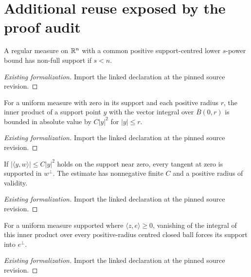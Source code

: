 \section{Additional reuse exposed by the proof audit}

\begin{lemma}
\label{gmt:support-not-full}
\leanok
A regular measure on $\mathbb R^n$ with a common positive support-centred lower $s$-power bound has non-full support if $s<n$.
\end{lemma}
\begin{proof}[Existing formalization]
\leanok
{}
Import the linked declaration at the pinned source revision.
\end{proof}

\begin{lemma}
\label{gmt:barycenter-quadratic-bound}
\leanok
For a uniform measure with zero in its support and each positive radius $r$, the inner product of a support point $y$ with the vector integral over $\overline B(0,r)$ is bounded in absolute value by $C|y|^2$ for $|y|\leq r$.
\end{lemma}
\begin{proof}[Existing formalization]
\leanok
{}
Import the linked declaration at the pinned source revision.
\end{proof}

\begin{lemma}
\label{gmt:quadratic-support-tangent}
\leanok
If $|\langle y,w\rangle|\leq C|y|^2$ holds on the support near zero, every tangent at zero is supported in $w^\perp$. The estimate has nonnegative finite $C$ and a positive radius of validity.
\end{lemma}
\begin{proof}[Existing formalization]
\leanok
{}
Import the linked declaration at the pinned source revision.
\end{proof}

\begin{lemma}
\label{gmt:zero-barycenter-hyperplane}
\leanok
For a uniform measure supported where $\langle z,e\rangle\geq0$, vanishing of the integral of this inner product over every positive-radius centred closed ball forces its support into $e^\perp$.
\end{lemma}
\begin{proof}[Existing formalization]
\leanok
{}
Import the linked declaration at the pinned source revision.
\end{proof}

